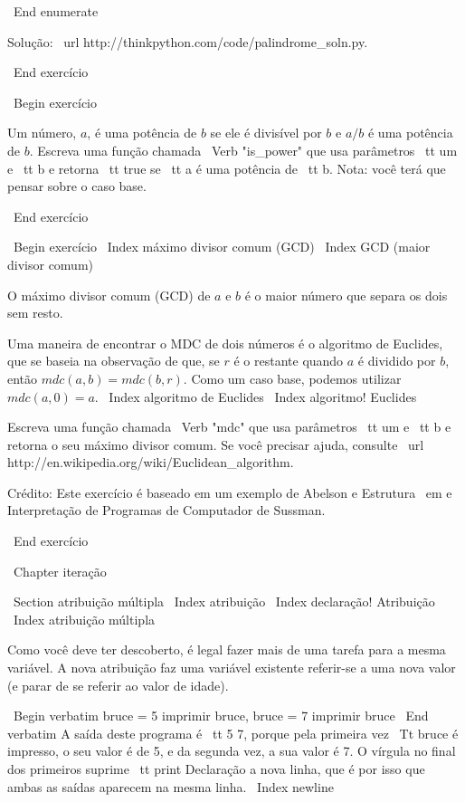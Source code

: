 \documentclass[10pt]{book}
\begin{document}
{{{{\ End {enumerate}

Solução: \ url {http://thinkpython.com/code/palindrome_soln.py}.

\ End {} exercício

\ Begin {} exercício

Um número, $ a $, é uma potência de $ b $ se ele é divisível por $ b $
e $ a / b $ é uma potência de $ b $. Escreva uma função chamada
\ Verb "is_power" que usa parâmetros {\ tt um} e {\ tt b}
e retorna {\ tt true} se {\ tt a} é uma potência de {\ tt b}.
Nota: você terá que pensar sobre o caso base.

\ End {} exercício


\ Begin {} exercício
\ Index {máximo divisor comum (GCD)}
\ Index {GCD (maior divisor comum)}

O máximo divisor comum (GCD) de $ a $ e $ b $ é o maior número
que separa os dois sem resto.  

Uma maneira de encontrar o MDC de dois números é o algoritmo de Euclides,
que se baseia na observação de que, se $ r $ é o restante
quando $ a $ é dividido por $ b $, então $ mdc (a, b) = mdc (b, r) $.
Como um caso base, podemos utilizar $ mdc (a, 0) = a $.
\ Index {algoritmo de Euclides}
\ Index {algoritmo! Euclides}

Escreva uma função chamada
\ Verb "mdc" que usa parâmetros {\ tt um} e {\ tt b}
e retorna o seu máximo divisor comum. Se você precisar
ajuda, consulte \ url {http://en.wikipedia.org/wiki/Euclidean_algorithm}.

Crédito: Este exercício é baseado em um exemplo de Abelson e
{Estrutura \ em e Interpretação de Programas de Computador} de Sussman.

\ End {} exercício


\ Chapter {iteração}

\ Section {atribuição múltipla}
\ Index {atribuição}
\ Index {declaração! Atribuição}
\ Index {atribuição múltipla}

Como você deve ter descoberto, é legal
fazer mais de uma tarefa para a mesma variável. A
nova atribuição faz uma variável existente referir-se a uma nova
valor (e parar de se referir ao valor de idade).

\ Begin {verbatim}
bruce = 5
imprimir bruce,
bruce = 7
imprimir bruce
\ End {verbatim}
%
A saída deste programa é {\ tt 5 7}, porque pela primeira vez
{\ Tt bruce} é impresso, o seu valor é de 5, e da segunda vez, a sua
valor é 7. O
vírgula no final dos primeiros suprime {\ tt print} Declaração
a nova linha, que é por isso que ambas as saídas
aparecem na mesma linha.
\ Index {newline}

}}}}
\end{document}
